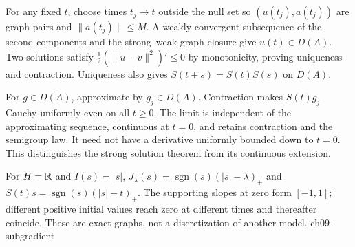 \begin{expandedproof}
For any fixed $t$, choose times $t_j\to t$ outside the null set so
$(u(t_j),a(t_j))$ are graph pairs and $\|a(t_j)\|\leq M$.
A weakly convergent subsequence of the second components and the
strong--weak graph closure give $u(t)\in D(A)$. Two solutions satisfy
$\frac12(\|u-v\|^2)'\leq0$ by monotonicity, proving uniqueness and
contraction. Uniqueness also gives $S(t+s)=S(t)S(s)$ on $D(A)$.

For $g\in\overline{D(A)}$, approximate by $g_j\in D(A)$.
Contraction makes $S(t)g_j$ Cauchy uniformly even on all $t\geq0$.
The limit is independent of the approximating sequence, continuous at
$t=0$, and retains contraction and the semigroup law. It need not have
a derivative uniformly bounded down to $t=0$. This distinguishes the
strong solution theorem from its continuous extension.
\end{expandedproof}
\Needspace{42mm}
{For $H=\mathbb{R}$ and $I(s)=|s|$, $J_\lambda(s)=\operatorname{sgn}(s)(|s|-\lambda)_+$ and $S(t)s=\operatorname{sgn}(s)(|s|-t)_+$. The supporting slopes at zero form $[-1,1]$; different positive initial values reach zero at different times and thereafter coincide. These are exact graphs, not a discretization of another model.}
{ch09-subgradient}

\Needspace{40mm}
